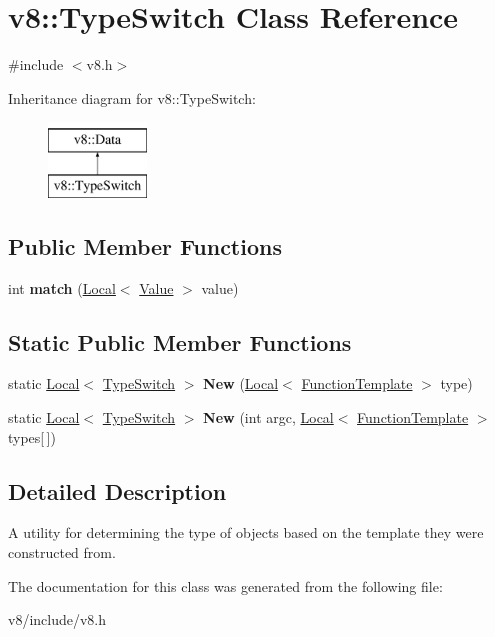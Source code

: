 \hypertarget{classv8_1_1TypeSwitch}{}\section{v8\+:\+:Type\+Switch Class Reference}
\label{classv8_1_1TypeSwitch}


{\ttfamily \#include $<$v8.\+h$>$}

Inheritance diagram for v8\+:\+:Type\+Switch\+:\begin{figure}[H]
\begin{center}
\leavevmode
\includegraphics[height=2.000000cm]{classv8_1_1TypeSwitch}
\end{center}
\end{figure}
\subsection*{Public Member Functions}
\begin{DoxyCompactItemize}
\item 
\hypertarget{classv8_1_1TypeSwitch_a451ac72b36c9262f2ada1903294bf349}{}int {\bfseries match} (\hyperlink{classv8_1_1Local}{Local}$<$ \hyperlink{classv8_1_1Value}{Value} $>$ value)\label{classv8_1_1TypeSwitch_a451ac72b36c9262f2ada1903294bf349}

\end{DoxyCompactItemize}
\subsection*{Static Public Member Functions}
\begin{DoxyCompactItemize}
\item 
\hypertarget{classv8_1_1TypeSwitch_ab4b2f799d73e9a55cdbd142d8d23e28c}{}static \hyperlink{classv8_1_1Local}{Local}$<$ \hyperlink{classv8_1_1TypeSwitch}{Type\+Switch} $>$ {\bfseries New} (\hyperlink{classv8_1_1Local}{Local}$<$ \hyperlink{classv8_1_1FunctionTemplate}{Function\+Template} $>$ type)\label{classv8_1_1TypeSwitch_ab4b2f799d73e9a55cdbd142d8d23e28c}

\item 
\hypertarget{classv8_1_1TypeSwitch_af8ab2f04e4f7db3bf90b6edba60d9ee2}{}static \hyperlink{classv8_1_1Local}{Local}$<$ \hyperlink{classv8_1_1TypeSwitch}{Type\+Switch} $>$ {\bfseries New} (int argc, \hyperlink{classv8_1_1Local}{Local}$<$ \hyperlink{classv8_1_1FunctionTemplate}{Function\+Template} $>$ types\mbox{[}$\,$\mbox{]})\label{classv8_1_1TypeSwitch_af8ab2f04e4f7db3bf90b6edba60d9ee2}

\end{DoxyCompactItemize}


\subsection{Detailed Description}
A utility for determining the type of objects based on the template they were constructed from. 

The documentation for this class was generated from the following file\+:\begin{DoxyCompactItemize}
\item 
v8/include/v8.\+h\end{DoxyCompactItemize}
